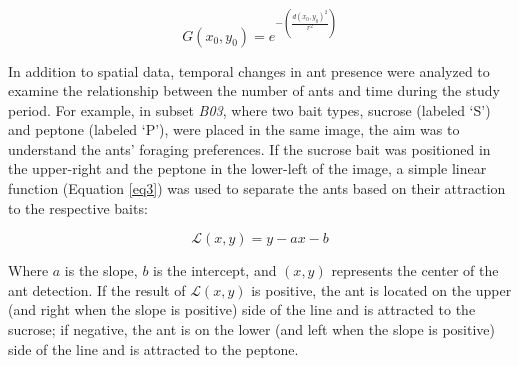 \begin{equation}
G(x_0, y_0) = e^{- \left( \frac{d(x_0, y_0)^2}{r^2} \right)}
\label{eq2}
\end{equation}

In addition to spatial data, temporal changes in ant presence were analyzed to examine the relationship between the number of ants and time during the study period. For example, in subset \textit{B03}, where two bait types, sucrose (labeled ‘S’) and peptone (labeled ‘P’), were placed in the same image, the aim was to understand the ants’ foraging preferences. If the sucrose bait was positioned in the upper-right and the peptone in the lower-left of the image, a simple linear function (Equation \ref{eq3}) was used to separate the ants based on their attraction to the respective baits:

\begin{equation}
\mathcal{L}(x, y) = y - a x - b
\label{eq3}
\end{equation}

Where $a$ is the slope, $b$ is the intercept, and $(x, y)$ represents the center of the ant detection. If the result of $\mathcal{L}(x, y)$ is positive, the ant is located on the upper (and right when the slope is positive) side of the line and is attracted to the sucrose; if negative, the ant is on the lower (and left when the slope is positive) side of the line and is attracted to the peptone.
